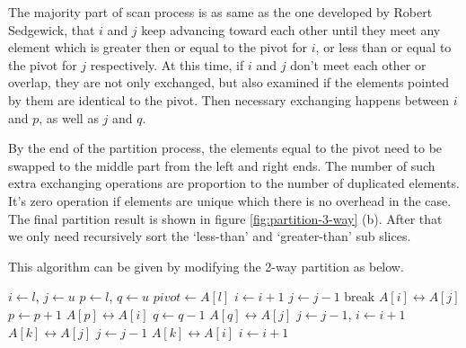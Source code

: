 \documentclass[b5paper]{article}
\begin{document}
The majority part of scan process is as same as the one developed by Robert Sedgewick, that
$i$ and $j$ keep advancing toward each other until they meet any element which is greater then or equal
to the pivot for $i$, or less than or equal to the pivot for $j$ respectively.
At this time, if $i$ and $j$ don't meet each other or overlap, they are not only
exchanged, but also examined if the elements pointed by them are identical to the pivot.
Then necessary exchanging happens between $i$ and $p$, as well as $j$ and $q$.

By the end of the partition process, the elements equal to the pivot need to be swapped to the middle
part from the left and right ends. The number of such extra exchanging operations are proportion to the
number of duplicated elements. It's zero operation if elements are unique which there is no overhead
in the case. The final partition result is shown in figure \ref{fig:partition-3-way} (b). After that
we only need recursively sort the `less-than' and `greater-than' sub slices.

This algorithm can be given by modifying the 2-way partition as below.

\begin{algorithmic}[1]
    \State $i \gets l$, $j \gets u$
    \State $p \gets l$, $q \gets u$ 
    \State $pivot \gets A[l]$
    \Loop
      \Repeat
        \State $i \gets i + 1$
       
      \Repeat
        \State $j \gets j - 1$
       
        \State break 
      \EndIf
      \State {} $A[i] \leftrightarrow A[j]$
       
        \State $p \gets p + 1$
        \State {} $A[p] \leftrightarrow A[i]$
      \EndIf
        \State $q \gets q - 1$
        \State {} $A[q] \leftrightarrow A[j]$
      \EndIf
    \EndLoop
     
      \State $j \gets j - 1$, $i \gets i + 1$
    \EndIf
     
      \State {} $A[k] \leftrightarrow A[j]$
      \State $j \gets j - 1$
    \EndFor
      \State {} $A[k] \leftrightarrow A[i]$
      \State $i \gets i + 1$
    \EndFor
    \State {}
    \State {}
  \EndIf
\EndProcedure
\end{algorithmic}
\end{document}
